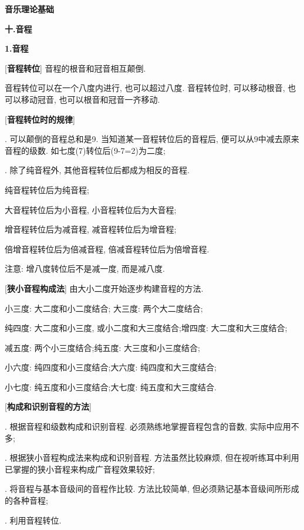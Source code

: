 

\begin{center} 
 \Large \textbf{音乐理论基础}\par
 \textbf{十.音程}
\end{center}

\large 
\begin{center}
 \textbf{1.音程}\\
\end{center}

[\textbf{音程转位}] 音程的根音和冠音相互颠倒.\par
\qquad 音程转位可以在一个八度内进行, 也可以超过八度. 音程转位时, 可以移动根音, 也可以移动冠音, 也可以根音和冠音一齐移动.\par

[\textbf{音程转位时的规律}] \par
{}. 可以颠倒的音程总和是9. 当知道某一音程转位后的音程后, 便可以从9中减去原来音程的级数. 如七度(7)转位后(9-7=2)为二度;\par
{}. 除了纯音程外, 其他音程转位后都成为相反的音程.\par
\qquad \qquad 纯音程转位后为纯音程;\par
\qquad \qquad 大音程转位后为小音程, 小音程转位后为大音程;\par
\qquad \qquad 增音程转位后为减音程, 减音程转位后为增音程;\par
\qquad \qquad 倍增音程转位后为倍减音程, 倍减音程转位后为倍增音程.\par
\qquad 注意: 增八度转位后不是减一度, 而是减八度.\par

[\textbf{狭小音程构成法}] 由大小二度开始逐步构建音程的方法.\par
\qquad 小三度: 大二度和小二度结合; \qquad 大三度: 两个大二度结合;\par
\qquad 纯四度: 大二度和小三度, 或小二度和大三度结合;\qquad 增四度: 大二度和大三度结合;\par
\qquad 减五度: 两个小三度结合;\qquad 纯五度: 大三度和小三度结合;\par
\qquad 小六度: 纯四度和小三度结合;\qquad 大六度: 纯四度和大三度结合;\par
\qquad 小七度: 纯五度和小三度结合;\qquad 大七度: 纯五度和大三度结合.\par

[\textbf{构成和识别音程的方法}]\par
{}. 根据音程和级数构成和识别音程. 必须熟练地掌握音程包含的音数, 实际中应用不多;\par
{}. 根据狭小音程构成法来构成和识别音程. 方法虽然比较麻烦, 但在视听练耳中利用已掌握的狭小音程来构成广音程效果较好;\par
{}. 将音程与基本音级间的音程作比较. 方法比较简单, 但必须熟记基本音级间所形成的各种音程;\par
{}. 利用音程转位.\par


